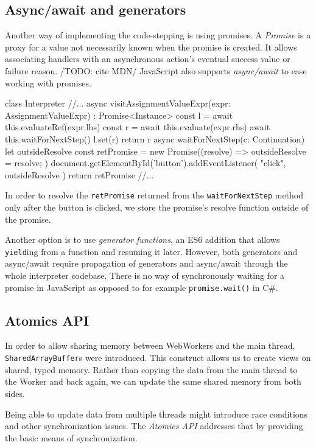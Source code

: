 \subsection*{Async/await and generators}
Another way of implementing the code-stepping is using promises. A \emph{Promise} is a proxy for a value not necessarily known when the promise is created.
It allows associating handlers with an asynchronous action's eventual success value or failure reason. /TODO: cite MDN/ JavaScript also supports \emph{async/await}
to ease working with promises.
\begin{code}
class Interpreter {
    //...
    async visitAssignmentValueExpr(expr: AssignmentValueExpr)
        : Promise<Instance> {
        const l = await this.evaluateRef(expr.lhs)
        const r = await this.evaluate(expr.rhs)
        await this.waitForNextStep()
        l.set(r)
        return r
    }
    async waitForNextStep(c: Continuation) {
        let outsideResolve
        const retPromise = new Promise((resolve) => { 
            outsideResolve = resolve; 
        })
        document.getElementById('button').addEventListener(
            "click",
            outsideResolve
        )
        return retPromise
    }
    //...
}
\end{code}
In order to resolve the \texttt{retPromise} returned from the \texttt{waitForNextStep} method only after the button is clicked, we store the promise's resolve
function outside of the promise.

Another option is to use \emph{generator functions}, an ES6 addition that allows \texttt{yield}ing from a function and resuming it later. However, both generators
and async/await require propagation of generators and async/await through the whole interpreter codebase. There is no way of synchronously waiting for a promise
in JavaScript as opposed to for example \texttt{promise.wait()} in C\#.
 
\subsection*{Atomics API}
\label{chap4:atomics}
In order to allow sharing memory between WebWorkers and the main thread, \texttt{SharedArrayBuffer}s were introduced. This construct allows us to create
views on shared, typed memory. Rather than copying the data from the main thread to the Worker and back again, we can update the same shared memory from both sides.

Being able to update data from multiple threads might introduce race conditions and other synchronization issues. The \emph{Atomics API} addresses that by providing
the basic means of synchronization.

